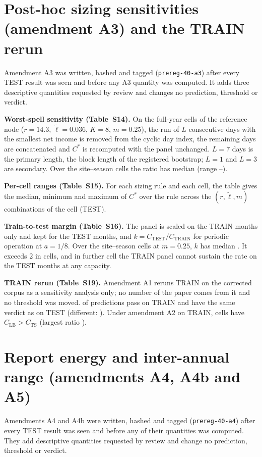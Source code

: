 \documentclass[10pt]{article}
\newcommand{\lt}{\tilde{\ell}}
\begin{document}
\section{Post-hoc sizing sensitivities (amendment A3) and the TRAIN rerun}
Amendment A3 was written, hashed and tagged (\texttt{prereg-40-a3}) after every TEST result was seen and before any A3 quantity was computed. It adds three descriptive quantities requested by review and changes no prediction, threshold or verdict.

\textbf{Worst-spell sensitivity (Table~S14).} On the full-year cells of the reference node ($r=14.3$, $\lt=0.036$, $K=8$, $m=0.25$), the run of $L$ consecutive days with the smallest net income is removed from the cyclic day index, the remaining days are concatenated and $C^*$ is recomputed with the panel unchanged. $L=7$ days is the primary length, the block length of the registered bootstrap; $L=1$ and $L=3$ are secondary. Over the \nCellsSS{} site--season cells the ratio has median \WorstMedS{} (range \WorstMinS--\WorstMaxS).

\textbf{Per-cell ranges (Table~S15).} For each sizing rule and each cell, the table gives the median, minimum and maximum of $C^*$ over the rule across the $(r,\lt,m)$ combinations of the cell (TEST).

\textbf{Train-to-test margin (Table~S16).} The panel is scaled on the TRAIN months only and kept for the TEST months, and $k=C_{\mathrm{TEST}}/C_{\mathrm{TRAIN}}$ for periodic operation at $a=1/8$. Over the \nCellsSS{} site--season cells at $m=0.25$, $k$ has median \KMedS{}. It exceeds 2 in \KGtTwoS{} cells, and in \KInfS{} further cell the TRAIN panel cannot sustain the rate on the TEST months at any capacity.

\textbf{TRAIN rerun (Table~S19).} Amendment A1 reruns TRAIN on the corrected corpus as a sensitivity analysis only; no number of the paper comes from it and no threshold was moved. \TrainPass{} of \TrainNall{} predictions pass on TRAIN and \TrainNsame{} have the same verdict as on TEST (different: \TrainDiff). Under amendment A2 on TRAIN, \AiiTrainViol{} cells have $C_{\mathrm{LB}}>C_{\mathrm{TS}}$ (largest ratio \AiiTrainMax).

\section{Report energy and inter-annual range (amendments A4, A4b and A5)}
Amendments A4 and A4b were written, hashed and tagged (\texttt{prereg-40-a4}) after every TEST result was seen and before any of their quantities was computed. They add descriptive quantities requested by review and change no prediction, threshold or verdict.
\end{document}
